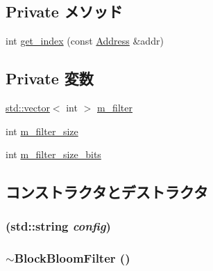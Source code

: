 \subsection*{Private メソッド}
\begin{DoxyCompactItemize}
\item 
int \hyperlink{classBlockBloomFilter_a0a9fd2f2f75033080fc27830f7c0fe64}{get\_\-index} (const \hyperlink{classAddress}{Address} \&addr)
\end{DoxyCompactItemize}
\subsection*{Private 変数}
\begin{DoxyCompactItemize}
\item 
\hyperlink{classstd_1_1vector}{std::vector}$<$ int $>$ \hyperlink{classBlockBloomFilter_aae3fd71ce4b5e8910aa63829ba6abd41}{m\_\-filter}
\item 
int \hyperlink{classBlockBloomFilter_af53abddc4707ab403450239a6e94c486}{m\_\-filter\_\-size}
\item 
int \hyperlink{classBlockBloomFilter_a5c26703945ae76ff80ec6951cccea29c}{m\_\-filter\_\-size\_\-bits}
\end{DoxyCompactItemize}


\subsection{コンストラクタとデストラクタ}
\hypertarget{classBlockBloomFilter_a8c4fc37142485d5cb1e414e2228a730b}{
\subsubsection[{BlockBloomFilter}]{ (std::string {\em config})}}
\label{classBlockBloomFilter_a8c4fc37142485d5cb1e414e2228a730b}
\hypertarget{classBlockBloomFilter_a94f11827de7c83b03ae2fb6da2f1fdf2}{
\subsubsection[{$\sim$BlockBloomFilter}]{\setlength{\rightskip}{0pt plus 5cm}$\sim${\bf BlockBloomFilter} ()}}
\label{classBlockBloomFilter_a94f11827de7c83b03ae2fb6da2f1fdf2}



